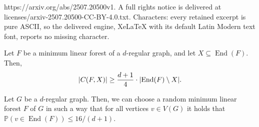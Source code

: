 \documentclass[10pt,a4paper]{amsart}
\DeclareMathOperator{\End}{End}
\DeclarePairedDelimiter{\abs}{\lvert}{\rvert}
\newcommand{\pr}{\mathbb{P}}
\begin{document}
https://arxiv.org/abs/2507.20500v1. A full rights notice is delivered at licenses/arxiv-2507.20500-CC-BY-4.0.txt. Characters: every retained excerpt is pure ASCII, so the delivered engine, XeLaTeX with its default Latin Modern text font, reports no missing character.
\begin{lemma}\label{prop:componentsize}
    Let $F$ be a minimum linear forest of a $d$-regular graph, and let $X \subseteq \End(F)$. Then,
    \[
        \abs{C(F,X)} \ge \frac{d+1}{4} \cdot \abs{\End(F) \setminus X}.
    \]
\end{lemma}

\begin{lemma}\label{lem:lowendpointprobability}
    Let $G$ be a $d$-regular graph. Then, we can choose a random minimum linear forest $F$ of $G$ in such a way that for all vertices $v \in V(G)$ it holds that $\pr(v \in \End(F)) \le 16/(d+1)$.
\end{lemma}
\end{document}
